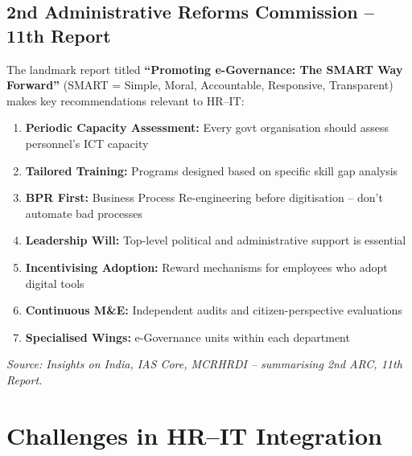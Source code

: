 \documentclass[12pt,a4paper]{article}
\begin{document}
\subsection{2nd Administrative Reforms Commission  --  11th Report}

The landmark report titled \textbf{``Promoting e-Governance: The SMART Way Forward''} (SMART = Simple, Moral, Accountable, Responsive, Transparent) makes key recommendations relevant to HR--IT:

\begin{enumerate}
  \item \textbf{Periodic Capacity Assessment:} Every govt organisation should assess personnel's ICT capacity
  \item \textbf{Tailored Training:} Programs designed based on specific skill gap analysis
  \item \textbf{BPR First:} Business Process Re-engineering before digitisation -- don't automate bad processes
  \item \textbf{Leadership Will:} Top-level political and administrative support is essential
  \item \textbf{Incentivising Adoption:} Reward mechanisms for employees who adopt digital tools
  \item \textbf{Continuous M\&E:} Independent audits and citizen-perspective evaluations
  \item \textbf{Specialised Wings:} e-Governance units within each department
\end{enumerate}

{\footnotesize\textit{Source: Insights on India, IAS Core, MCRHRDI  --  summarising 2nd ARC, 11th Report.}}

\section{Challenges in HR--IT Integration}
\end{document}
